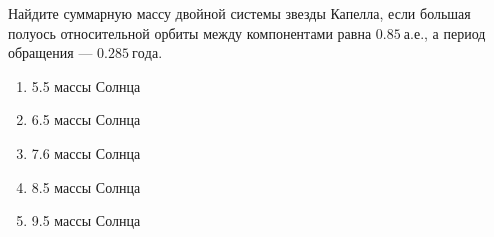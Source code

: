 Найдите суммарную массу двойной системы звезды Капелла, если
большая полуось относительной орбиты между компонентами равна $\qty{0.85}{а.е.}$,
а период обращения — $\qty{0.285}{года}$.

\begin{enumerate}[label=\alph*)]
  \item 5.5 массы Солнца
  \item 6.5 массы Солнца
  \item 7.6 массы Солнца
  \item 8.5 массы Солнца
  \item 9.5 массы Солнца
\end{enumerate}
